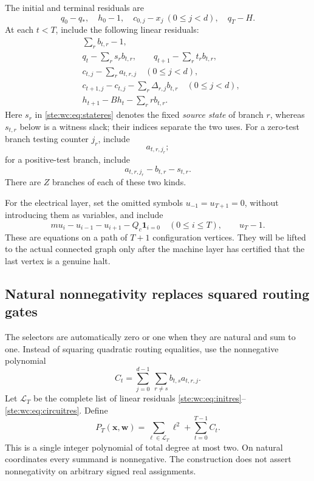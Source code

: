 \documentclass[11pt,letterpaper]{article}
\theoremstyle{definition}
\theoremstyle{remark}
\begin{document}
The initial and terminal residuals are
\begin{equation}\label{ste:wc:eq:initres}
 q_0-q_*,\quad h_0-1,\quad c_{0,j}-x_j\ (0\leq j<d),\quad q_T-H.
\end{equation}
At each $t<T$, include the following linear residuals:
\begin{align}
 &\sum_r b_{t,r}-1,\label{ste:wc:eq:selectorres}\\
 &q_t-\sum_r s_r b_{t,r},\qquad
 q_{t+1}-\sum_r t_r b_{t,r},\label{ste:wc:eq:stateres}\\
 &c_{t,j}-\sum_r a_{t,r,j}\quad(0\leq j<d),\label{ste:wc:eq:routeres}\\
 &c_{t+1,j}-c_{t,j}-\sum_r\Delta_{r,j}b_{t,r}
       \quad(0\leq j<d),\label{ste:wc:eq:updateres}\\
 &h_{t+1}-Bh_t-\sum_r r b_{t,r}.\label{ste:wc:eq:histres}
\end{align}
Here $s_r$ in \eqref{ste:wc:eq:stateres} denotes the fixed \emph{source state} of
branch $r$, whereas $s_{t,r}$ below is a witness slack; their indices
separate the two uses. For a zero-test branch testing counter $j_r$, include
\begin{equation}\label{ste:wc:eq:zerores}
 a_{t,r,j_r};
\end{equation}
for a positive-test branch, include
\begin{equation}\label{ste:wc:eq:posres}
 a_{t,r,j_r}-b_{t,r}-s_{t,r}.
\end{equation}
There are $Z$ branches of each of these two kinds.

For the electrical layer, set the omitted symbols $u_{-1}=u_{T+1}=0$,
without introducing them as variables, and include
\begin{equation}\label{ste:wc:eq:circuitres}
 m u_i-u_{i-1}-u_{i+1}-Q_c\mathbf1_{i=0}\quad(0\leq i\leq T),
 \qquad u_T-1.
\end{equation}
These are equations on a path of $T+1$ configuration vertices. They will
be lifted to the actual connected graph only after the machine layer
has certified that the last vertex is a genuine halt.

\subsection{Natural nonnegativity replaces squared routing gates}
The selectors are automatically zero or one when they are natural and
sum to one. Instead of squaring quadratic routing equalities, use the
nonnegative polynomial
\begin{equation}\label{ste:wc:eq:cross}
 C_t=\sum_{j=0}^{d-1}\ \sum_{r\ne s} b_{t,s}a_{t,r,j}.
\end{equation}
Let $\mathcal L_T$ be the complete list of linear residuals
\eqref{ste:wc:eq:initres}--\eqref{ste:wc:eq:circuitres}. Define
\begin{equation}\label{ste:wc:eq:PT}
 P_T(\bm x,\bm w)=\sum_{\ell\in\mathcal L_T}\ell^2+
                  \sum_{t=0}^{T-1} C_t.
\end{equation}
This is a single integer polynomial of total degree at most two. On natural
coordinates every summand is nonnegative. The construction does not assert
nonnegativity on arbitrary signed real assignments.
\end{document}
